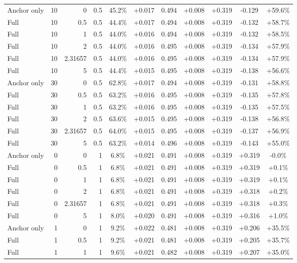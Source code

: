 \begin{table}[htbp]
\begin{tabular}{lrrrccccccc}
Anchor only & 10 & 0 & 0.5 & 45.2\% & +0.017 & 0.494 & +0.008 & +0.319 & -0.129 & +59.6\% \\
Full & 10 & 0.5 & 0.5 & 44.4\% & +0.017 & 0.494 & +0.008 & +0.319 & -0.132 & +58.7\% \\
Full & 10 & 1 & 0.5 & 44.0\% & +0.016 & 0.494 & +0.008 & +0.319 & -0.132 & +58.5\% \\
Full & 10 & 2 & 0.5 & 44.0\% & +0.016 & 0.495 & +0.008 & +0.319 & -0.134 & +57.9\% \\
Full & 10 & 2.31657 & 0.5 & 44.0\% & +0.016 & 0.495 & +0.008 & +0.319 & -0.134 & +57.9\% \\
Full & 10 & 5 & 0.5 & 44.4\% & +0.015 & 0.495 & +0.008 & +0.319 & -0.138 & +56.6\% \\
Anchor only & 30 & 0 & 0.5 & 62.8\% & +0.017 & 0.494 & +0.008 & +0.319 & -0.131 & +58.8\% \\
Full & 30 & 0.5 & 0.5 & 63.2\% & +0.016 & 0.495 & +0.008 & +0.319 & -0.135 & +57.8\% \\
Full & 30 & 1 & 0.5 & 63.2\% & +0.016 & 0.495 & +0.008 & +0.319 & -0.135 & +57.5\% \\
Full & 30 & 2 & 0.5 & 63.6\% & +0.015 & 0.495 & +0.008 & +0.319 & -0.138 & +56.8\% \\
Full & 30 & 2.31657 & 0.5 & 64.0\% & +0.015 & 0.495 & +0.008 & +0.319 & -0.137 & +56.9\% \\
Full & 30 & 5 & 0.5 & 63.2\% & +0.014 & 0.496 & +0.008 & +0.319 & -0.143 & +55.0\% \\
Anchor only & 0 & 0 & 1 & 6.8\% & +0.021 & 0.491 & +0.008 & +0.319 & +0.319 & -0.0\% \\
Full & 0 & 0.5 & 1 & 6.8\% & +0.021 & 0.491 & +0.008 & +0.319 & +0.319 & +0.1\% \\
Full & 0 & 1 & 1 & 6.8\% & +0.021 & 0.491 & +0.008 & +0.319 & +0.319 & +0.1\% \\
Full & 0 & 2 & 1 & 6.8\% & +0.021 & 0.491 & +0.008 & +0.319 & +0.318 & +0.2\% \\
Full & 0 & 2.31657 & 1 & 6.8\% & +0.021 & 0.491 & +0.008 & +0.319 & +0.318 & +0.3\% \\
Full & 0 & 5 & 1 & 8.0\% & +0.020 & 0.491 & +0.008 & +0.319 & +0.316 & +1.0\% \\
Anchor only & 1 & 0 & 1 & 9.2\% & +0.022 & 0.481 & +0.008 & +0.319 & +0.206 & +35.5\% \\
Full & 1 & 0.5 & 1 & 9.2\% & +0.021 & 0.481 & +0.008 & +0.319 & +0.205 & +35.7\% \\
Full & 1 & 1 & 1 & 9.6\% & +0.021 & 0.482 & +0.008 & +0.319 & +0.207 & +35.0\% \\

\end{tabular}
\end{table}
